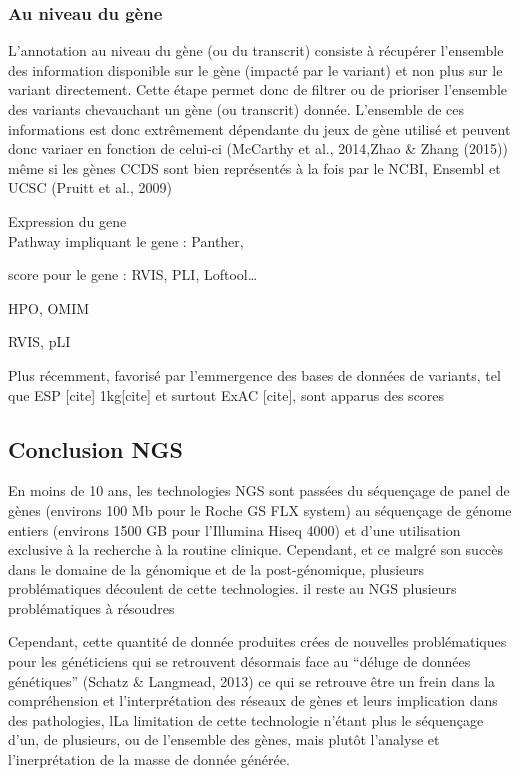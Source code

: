 \documentclass[12pt,twoside]{reedthesis}
\theoremstyle{definition}
\theoremstyle{definition}
\theoremstyle{remark}
\begin{document}
  \subsubsection{Au niveau du gène}\label{au-niveau-du-gene}
  
  L'annotation au niveau du gène (ou du transcrit) consiste à récupérer
  l'ensemble des information disponible sur le gène (impacté par le
  variant) et non plus sur le variant directement. Cette étape permet donc
  de filtrer ou de prioriser l'ensemble des variants chevauchant un gène
  (ou transcrit) donnée. L'ensemble de ces informations est donc
  extrêmement dépendante du jeux de gène utilisé et peuvent donc variaer
  en fonction de celui-ci (McCarthy et al., 2014,Zhao \& Zhang (2015))
  même si les gènes CCDS sont bien représentés à la fois par le NCBI,
  Ensembl et UCSC (Pruitt et al., 2009)
  
  Expression du gene\\
  Pathway impliquant le gene : Panther,
  
  score pour le gene : RVIS, PLI, Loftool\ldots{}
  
  HPO, OMIM
  
  RVIS, pLI
  
  Plus récemment, favorisé par l'emmergence des bases de données de
  variants, tel que ESP {[}cite{]} 1kg{[}cite{]} et surtout ExAC
  {[}cite{]}, sont apparus des scores
  
  \subsection{Conclusion NGS}\label{conclusion-ngs}
  
  En moins de 10 ans, les technologies NGS sont passées du séquençage de
  panel de gènes (environs 100 Mb pour le Roche GS FLX system) au
  séquençage de génome entiers (environs 1500 GB pour l'Illumina Hiseq
  4000) et d'une utilisation exclusive à la recherche à la routine
  clinique. Cependant, et ce malgré son succès dans le domaine de la
  génomique et de la post-génomique, plusieurs problématiques découlent de
  cette technologies. il reste au NGS plusieurs problématiques à résoudres
  
  Cependant, cette quantité de donnée produites crées de nouvelles
  problématiques pour les généticiens qui se retrouvent désormais face au
  ``déluge de données génétiques'' (Schatz \& Langmead, 2013) ce qui se
  retrouve être un frein dans la compréhension et l'interprétation des
  réseaux de gènes et leurs implication dans des pathologies, lLa
  limitation de cette technologie n'étant plus le séquençage d'un, de
  plusieurs, ou de l'ensemble des gènes, mais plutôt l'analyse et
  l'inerprétation de la masse de donnée générée.
  
\end{document}
